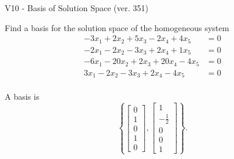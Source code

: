 \begin{exercise}
  \begin{exerciseTitle}V10 - Basis of Solution Space (ver. 351)\end{exerciseTitle}
  \begin{exerciseStatement}
    Find a basis for the solution space of the homogeneous system 
\begin{align*}
 -3 x_ 1 + 2 x_ 2 + 5 x_ 3 -2 x_ 4 + 4 x_ 5 &= 0  \\ 
  -2 x_ 1 -2 x_ 2 -3 x_ 3 + 2 x_ 4 + 1 x_ 5 &= 0  \\ 
  -6 x_ 1 -20 x_ 2 + 2 x_ 3 + 20 x_ 4 -4 x_ 5 &= 0  \\ 
  3 x_ 1 -2 x_ 2 -3 x_ 3 + 2 x_ 4 -4 x_ 5 &= 0  \\ 
 \end{align*}


 
  \end{exerciseStatement}

  \begin{exerciseAnswer}
   A basis is   
\[\left\{\left[\begin{array}{c}
0 \\
1 \\
0 \\
1 \\
0
\end{array}\right] , \left[\begin{array}{c}
1 \\
-\frac{1}{2} \\
0 \\
0 \\
1
\end{array}\right]\right\}.\]

  


  \end{exerciseAnswer}
\end{exercise}